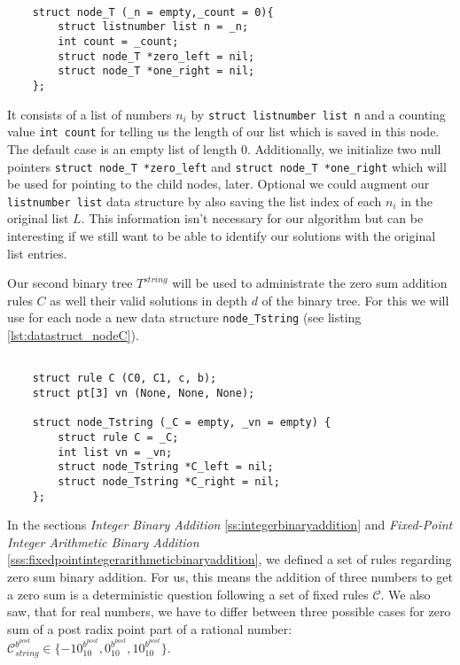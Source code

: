 \begin{lstlisting}[caption={Data structure \texttt{node\_T} for saving the information of one node of our binary tree $T$}, label=lst:datastruct_node]

    struct node_T (_n = empty,_count = 0){
        struct listnumber list n = _n;
        int count = _count;
        struct node_T *zero_left = nil;
        struct node_T *one_right = nil;
    };

\end{lstlisting}

It consists of a list of numbers $n_{i}$ by \texttt{struct listnumber list n} and a counting value \texttt{int count} for telling us the length of our list which is saved in this node. The default case is an empty list of length $0$. Additionally, we initialize two null pointers \texttt{struct node\_T *zero\_left} and \texttt{struct node\_T *one\_right} which will be used for pointing to the child nodes, later. Optional we could augment our \texttt{listnumber list} data structure by also saving the list index of each $n_{i}$ in the original list $L$. This information isn't necessary for our algorithm but can be interesting if we still want to be able to identify our solutions with the original list entries. 

Our second binary tree $T^{string}$ will be used to administrate the zero sum addition rules $C$ as well their valid solutions in depth $d$ of the binary tree. For this we will use for each node a new data structure \texttt{node\_Tstring} (see listing \ref{lst:datastruct_nodeC}). 


\begin{lstlisting}[caption={Data structure \texttt{node\_Tstring} for saving the information of one node of our binary tree $T^{string}$}, label=lst:datastruct_nodeC]

    struct rule C (C0, C1, c, b);
    struct pt[3] vn (None, None, None); 

    struct node_Tstring (_C = empty, _vn = empty) {
        struct rule C = _C;
        int list vn = _vn;
        struct node_Tstring *C_left = nil;
        struct node_Tstring *C_right = nil;
    };

\end{lstlisting}

In the sections \textit{Integer Binary Addition} \ref{ss:integerbinaryaddition} and \textit{Fixed-Point Integer Arithmetic Binary Addition} \ref{sss:fixedpointintegerarithmeticbinaryaddition}, we defined a set of rules regarding zero sum binary addition. For us, this means the addition of three numbers to get a zero sum is a deterministic question following a set of fixed rules $\mathcal{C}$. We also saw, that for real numbers, we have to differ between three possible cases for zero sum of a post radix point part of a rational number: $\mathcal{C}^{b^{post}}_{string} \in \{-10^{b^{post}}_{10}, 0^{b^{post}}_{10}, 10^{b^{post}}_{10} \}$.

